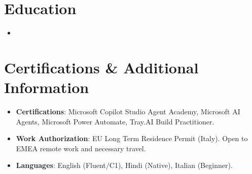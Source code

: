 \documentclass[10pt,a4paper,sans]{moderncv}
\begin{document}
\section{Education}
\vspace{1pt}
\begin{itemize}
\item{}
\end{itemize}
\vspace{3pt}

\section{Certifications \& Additional Information}
\vspace{1pt}
\begin{itemize}
\item \textbf{Certifications}: Microsoft Copilot Studio Agent Academy, Microsoft AI Agents, Microsoft Power Automate, Tray.AI Build Practitioner.
\item \textbf{Work Authorization}: EU Long Term Residence Permit (Italy). Open to EMEA remote work and necessary travel.
\item \textbf{Languages}: English (Fluent/C1), Hindi (Native), Italian (Beginner).
\end{itemize}
\end{document}
